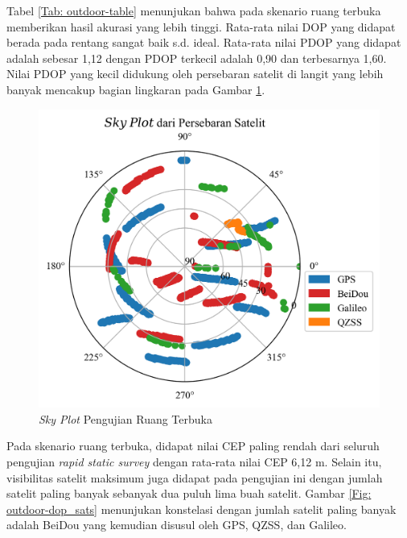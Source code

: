Tabel \ref{Tab: outdoor-table} menunjukan bahwa pada skenario ruang terbuka memberikan hasil akurasi yang lebih tinggi. Rata-rata nilai DOP yang didapat berada pada rentang sangat baik s.d. ideal. Rata-rata nilai PDOP yang didapat adalah sebesar 1,12 dengan PDOP terkecil adalah 0,90 dan terbesarnya 1,60. Nilai PDOP yang kecil didukung oleh persebaran satelit di langit yang lebih banyak mencakup bagian lingkaran pada Gambar \ref{Fig: outdoor-skyplot}.

\begin{figure}[H]
	\centering
	\includegraphics[width=12cm]{contents/chapter-4/4-skenario-outdoor/sky_plot.png}
	\caption{\textit{Sky Plot} Pengujian Ruang Terbuka}
	\label{Fig: outdoor-skyplot}
\end{figure}

Pada skenario ruang terbuka, didapat nilai CEP paling rendah dari seluruh pengujian \textit{rapid static survey} dengan rata-rata nilai CEP 6,12 m. Selain itu, visibilitas satelit maksimum juga didapat pada pengujian ini dengan jumlah satelit paling banyak sebanyak dua puluh lima buah satelit. Gambar \ref{Fig: outdoor-dop_sats} menunjukan konstelasi dengan jumlah satelit paling banyak adalah BeiDou yang kemudian disusul oleh GPS, QZSS, dan Galileo. 

